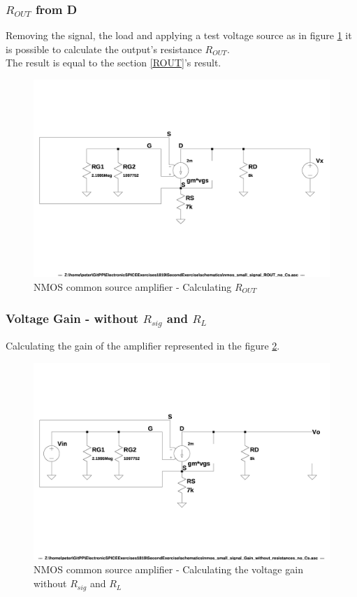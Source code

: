 \documentclass[10pt,a4paper]{book}
\begin{document}
\subsubsection{$R_{OUT}$ from D}

Removing the signal, the load and applying a test voltage source as in figure \ref{nmos_pi_ROUT_no_Cs} it is possible to calculate the output's resistance $R_{OUT}$.\\
The result is equal to the section \ref{ROUT}'s result.\par

\begin{figure}[h]
  \centering
  \includegraphics[width=12cm]{schematics/nmos_small_signal_ROUT_no_Cs.jpg}
  \caption{NMOS common source amplifier - Calculating $R_{OUT}$}
  \label{nmos_pi_ROUT_no_Cs}
\end{figure}

\subsubsection{Voltage Gain - without $R_{sig}$ and $R_L$}
Calculating the gain of the amplifier represented in the figure \ref{nmos_pi_gain_without_resistances_no_Cs}.

\begin{figure}[h]
  \centering
  \includegraphics[width=12cm]{schematics/nmos_small_signal_without_resistances_no_Cs.jpg}
  \caption{NMOS common source amplifier - Calculating the voltage gain without $R_{sig}$ and $R_L$}
  \label{nmos_pi_gain_without_resistances_no_Cs}
\end{figure}
\end{document}
